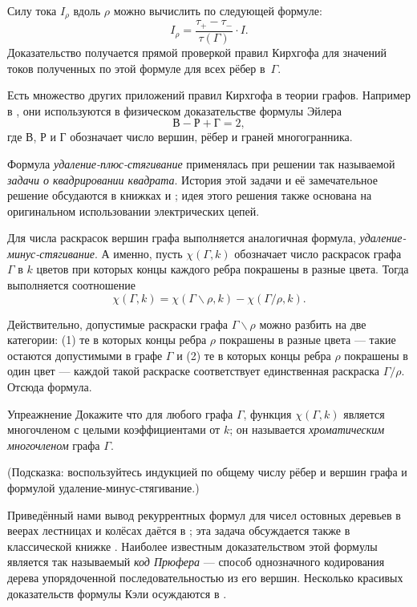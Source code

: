 \documentclass{article}
\begin{document}
Силу тока $I_\rho$ вдоль $\rho$ можно вычислить по следующей формуле:
\[I_\rho=\frac{\tau_+-\tau_-}{\tau(\Gamma)}\cdot I.\]
Доказательство получается прямой проверкой правил Кирхгофа для значений токов полученных по этой формуле для всех рёбер в~$\Gamma$.

Есть множество других приложений правил Кирхгофа в теории графов. 
Например в \cite{levi}, они используются в физическом доказательстве формулы Эйлера
\[\text{В}-\text{Р}+\text{Г}=2,\]
где $\text{В}$, $\text{Р}$ и $\text{Г}$ обозначает число вершин, рёбер и граней многогранника.

Формула \emph{удаление-плюс-стягивание} применялась при решении так называемой \emph{задачи о квадрировании квадрата}.
История этой задачи и её замечательное решение обсудаются в книжках \cite{yaglom} и \cite[Глава 32]{gardner};
идея этого решения также основана на оригинальном использовании электрических цепей.

Для числа раскрасок вершин графа выполняется аналогичная формула, \emph{удаление-минус-стягивание}.
А именно, пусть $\chi(\Gamma,k)$ обозначает число раскрасок графа $\Gamma$ в $k$ цветов при которых концы каждого ребра покрашены в разные цвета.
Тогда выполняется соотношение
\[\chi(\Gamma,k)=\chi(\Gamma\backslash\rho,k)-\chi(\Gamma/\rho,k).\]

Действительно, допустимые раскраски графа $\Gamma\backslash\rho$ можно разбить на две категории: (1) те в которых концы ребра $\rho$ покрашены в разные цвета --- такие остаются допустимыми в графе $\Gamma$ и (2) те в которых концы ребра $\rho$ покрашены в один цвет --- каждой такой раскраске соответствует единственная раскраска $\Gamma/\rho$.
Отсюда формула.

\begin{thm}{Упреажнение}
Докажите что для любого графа $\Gamma$, функция $\chi(\Gamma,k)$ является многочленом с целыми коэффициентами от $k$;
он называется \emph{хроматическим многочленом} графа $\Gamma$.

(Подсказка: воспользуйтесь индукцией по общему числу рёбер и вершин графа и формулой удаление-минус-стягивание.)
\end{thm}




Приведённый нами вывод рекуррентных формул для чисел ос\-тов\-ных деревьев в веерах лестницах и колёсах даётся в \cite{haghighi-bibak};
эта задача обсуждается также в классической книжке \cite{knut}.
Наиболее известным доказательством этой формулы является так называемый \emph{код Прюфера} --- способ однозначного кодирования дерева упорядоченной последовательностью из его вершин.
Несколько красивых доказательств формулы Кэли осуждаются в \cite[Глава 30]{aigner-ziegler}.
\end{document}
